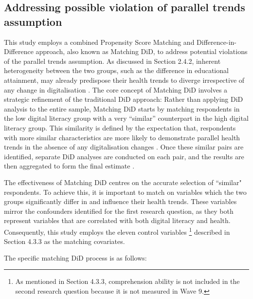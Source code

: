 \subsection{Addressing possible violation of parallel trends assumption}
This study employs a combined Propensity Score Matching and Difference-in-Difference approach, also known as Matching DiD, to address potential violations of the parallel trends assumption. As discussed in Section 2.4.2, inherent heterogeneity between the two groups, such as the difference in educational attainment, may already predispose their health trends to diverge irrespective of any change in digitalisation \parencite{hall_digital_2015}. The core concept of Matching DiD involves a strategic refinement of the traditional DiD approach: Rather than applying DiD analysis to the entire sample, Matching DiD starts by matching respondents in the low digital literacy group with a very ``similar” counterpart in the high digital literacy group. This similarity is defined by the expectation that, respondents with more similar characteristics are more likely to demonstrate parallel health trends in the absence of any digitalisation changes \parencite{pufahl_evaluating_2009}. Once these similar pairs are identified, separate DiD analyses are conducted on each pair, and the results are then aggregated to form the final estimate \parencite{dehejia_causal_1999}.

The effectiveness of Matching DiD centres on the accurate selection of ``similar" respondents. To achieve this, it is important to match on variables which the two groups significantly differ in and influence their health trends. These variables mirror the confounders identified for the first research question, as they both represent variables that are correlated with both digital literacy and health. Consequently, this study employs the eleven control variables \footnote{As mentioned in Section 4.3.3, comprehension ability is not included in the second research question because it is not measured in Wave 9.} described in Section 4.3.3 as the matching covariates.

The specific matching DiD process is as follows:

